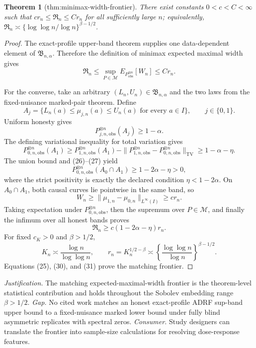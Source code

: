 \documentclass{article}
\newtheorem{theorem}{Theorem}
\begin{document}
\begin{theorem}[thm:minimax-width-frontier]\label{thm:minimax-width-frontier}
There exist constants \(0<c<C<\infty\) such that \(c r_n\le\mathfrak R_n\le C r_n\) for all sufficiently large \(n\); equivalently, \(\mathfrak R_n\asymp\{\log\log n/\log n\}^{\beta-1/2}\).
\end{theorem}
\begin{proof}
The exact-profile upper-band theorem supplies one data-dependent element of \(\mathfrak B_{n,\alpha}\).  Therefore the definition of minimax expected maximal width gives
\[
\mathfrak R_n
\le\sup_{P\in\mathcal M}E_{P_{\mathrm{obs}}^{\otimes n}}[W_n]
\le Cr_n. \tag{25}
\]

For the converse, take an arbitrary \((L_n,U_n)\in\mathfrak B_{n,\alpha}\) and the two laws from the fixed-nuisance marked-pair theorem.  Define
\[
A_j=\{L_n(a)\le\mu_{j,n}(a)\le U_n(a)
\text{ for every }a\in I\},
\qquad j\in\{0,1\}.
\]
Uniform honesty gives
\[
P_{j,n,\mathrm{obs}}^{\otimes n}(A_j)\ge1-\alpha. \tag{26}
\]
The defining variational inequality for total variation gives
\[
P_{0,n,\mathrm{obs}}^{\otimes n}(A_1)
\ge P_{1,n,\mathrm{obs}}^{\otimes n}(A_1)
-\|P_{1,n,\mathrm{obs}}^{\otimes n}-P_{0,n,\mathrm{obs}}^{\otimes n}\|_{\mathrm{TV}}
\ge1-\alpha-\eta. \tag{27}
\]
The union bound and (26)--(27) yield
\[
P_{0,n,\mathrm{obs}}^{\otimes n}(A_0\cap A_1)
\ge1-2\alpha-\eta>0, \tag{28}
\]
where the strict positivity is exactly the declared condition \(\eta<1-2\alpha\).  On \(A_0\cap A_1\), both causal curves lie pointwise in the same band, so
\[
W_n\ge\|\mu_{1,n}-\mu_{0,n}\|_{L^\infty(I)}\ge cr_n. \tag{29}
\]
Taking expectation under \(P_{0,n,\mathrm{obs}}^{\otimes n}\), then the supremum over \(P\in\mathcal M\), and finally the infimum over all honest bands proves
\[
\mathfrak R_n\ge c(1-2\alpha-\eta)r_n. \tag{30}
\]
For fixed \(c_K>0\) and \(\beta>1/2\),
\[
K_n\asymp\frac{\log n}{\log\log n},
\qquad
r_n=K_n^{1/2-\beta}
\asymp\left\{\frac{\log\log n}{\log n}\right\}^{\beta-1/2}. \tag{31}
\]
Equations (25), (30), and (31) prove the matching frontier.
\end{proof}
\par\smallskip\noindent \textit{Justification.} The matching expected-maximal-width frontier is the theorem-level statistical contribution and holds throughout the Sobolev embedding range \(\beta>1/2\). \textit{Gap.} No cited work matches an honest exact-profile ADRF sup-band upper bound to a fixed-nuisance marked lower bound under fully blind asymmetric replicates with spectral zeros. \textit{Consumer.} Study designers can translate the frontier into sample-size calculations for resolving dose-response features.
\end{document}
